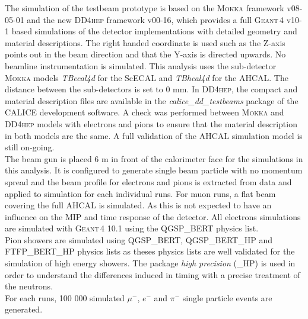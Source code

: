 \documentclass[twoside,a4paper,11pt]{article}
\newcommand\geant{\textsc{Geant\,4}\xspace}
\newcommand\mokka{\textsc{Mokka}\xspace}
\newcommand\ddhep{\textsc{DD4hep}\xspace}
\begin{document}
The simulation of the testbeam prototype is based on the \mokka framework v08-05-01 and the new \ddhep framework v00-16, which provides a full \geant v10-1 based simulations of the detector implementations with detailed geometry and material descriptions. The right handed coordinate is used such as the Z-axis points out in the beam direction and that the Y-axis is directed upwards. No beamline instrumentation is simulated. This analysis uses the sub-detector \mokka models \textit{TBecal4d} for the ScECAL and \textit{TBhcal4d} for the AHCAL. The distance between the sub-detectors is set to 0 mm. In \ddhep, the compact and material description files are available in the \textit{calice\_dd\_testbeams} package of the CALICE development software. A check was performed between \mokka and \ddhep models with electrons and pions to ensure that the material description in both models are the same. A full validation of the AHCAL simulation model is still on-going.\\
The beam gun is placed 6 m in front of the calorimeter face for the simulations in this analysis. It is configured to generate single beam particle with no momentum spread and the beam profile for electrons and pions is extracted from data and applied to simulation for each individual runs. For muon runs, a flat beam covering the full AHCAL is simulated. As this is not expected to have an influence on the MIP and time response of the detector.
All electrons simulations are simulated with \geant 10.1 using the QGSP\_BERT physics list.\\
Pion showers are simulated using QGSP\_BERT, QGSP\_BERT\_HP and FTFP\_BERT\_HP physics lists as theses physics lists are well validated for the simulation of high energy showers. The package \textit{high precision} (\_HP) is used in order to understand the differences induced in timing with a precise treatment of the neutrons.\\
For each runs, 100 000 simulated $\mu^-$, $e^-$ and $\pi^-$ single particle events are generated.\\
\end{document}
